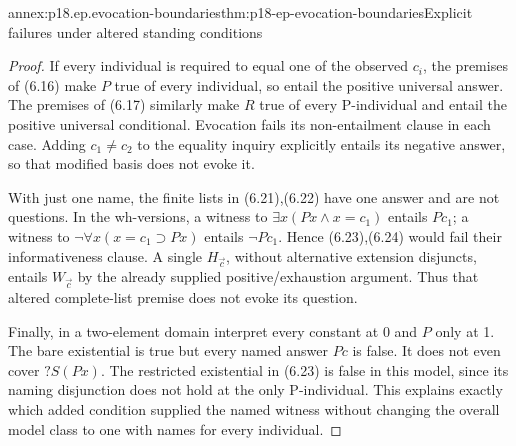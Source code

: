 \begin{annexitem}{annex:p18.ep.evocation-boundaries}{thm:p18-ep-evocation-boundaries}{Explicit failures under altered standing conditions}
\begin{proof}
If every individual is required to equal one of the observed \(c_i\),
the premises of (6.16) make \(P\) true of every individual, so entail
the positive universal answer. The premises of (6.17) similarly make
\(R\) true of every P-individual and entail the positive universal
conditional. Evocation fails its non-entailment clause in each case.
Adding \(c_1\ne c_2\) to the equality inquiry explicitly entails its
negative answer, so that modified basis does not evoke it.

With just one name, the finite lists in (6.21),(6.22) have one answer
and are not questions. In the wh-versions, a witness to
\(\exists x(Px\land x=c_1)\) entails \(Pc_1\); a witness to
\(\neg\forall x(x=c_1\supset Px)\) entails \(\neg Pc_1\).
Hence (6.23),(6.24) would fail their informativeness clause. A single
\(H_{\vec c}\), without alternative extension disjuncts, entails
\(W_{\vec c}\) by the already supplied positive/exhaustion argument.
Thus that altered complete-list premise does not evoke its question.

Finally, in a two-element domain interpret every constant at 0 and
\(P\) only at 1. The bare existential is true but every named answer
\(Pc\) is false. It does not even cover \(?S(Px)\). The restricted
existential in (6.23) is false in this model, since its naming disjunction
does not hold at the only P-individual. This explains exactly which added
condition supplied the named witness without changing the overall model
class to one with names for every individual.
\end{proof}
\end{annexitem}

